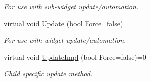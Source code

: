 \begin{DoxyCompactItemize}
\begin{DoxyCompactList}\small\item\em For use with sub-\/widget update/automation. \item\end{DoxyCompactList}\item 
\hypertarget{classMezzanine_1_1UI_1_1Widget_aeb05b9fb68cdfc58fcff45d03e80dd39}{
virtual void \hyperlink{classMezzanine_1_1UI_1_1Widget_aeb05b9fb68cdfc58fcff45d03e80dd39}{Update} (bool Force=false)}
\label{classMezzanine_1_1UI_1_1Widget_aeb05b9fb68cdfc58fcff45d03e80dd39}

\begin{DoxyCompactList}\small\item\em For use with widget update/automation. \item\end{DoxyCompactList}\item 
\hypertarget{classMezzanine_1_1UI_1_1Widget_abe60b3fb3de99433fe4823b12a43ffb4}{
virtual void \hyperlink{classMezzanine_1_1UI_1_1Widget_abe60b3fb3de99433fe4823b12a43ffb4}{UpdateImpl} (bool Force=false)=0}
\label{classMezzanine_1_1UI_1_1Widget_abe60b3fb3de99433fe4823b12a43ffb4}

\begin{DoxyCompactList}\small\item\em Child specific update method. \item\end{DoxyCompactList}\end{DoxyCompactItemize}
